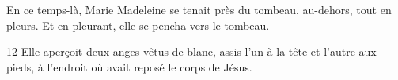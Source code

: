 En ce temps-là, Marie Madeleine se tenait près du tombeau, au-dehors, tout en pleurs. Et en pleurant, elle se pencha vers le tombeau.

12 Elle aperçoit deux anges vêtus de blanc, assis l’un à la tête et l’autre aux pieds, à l’endroit où avait reposé le corps de Jésus.
